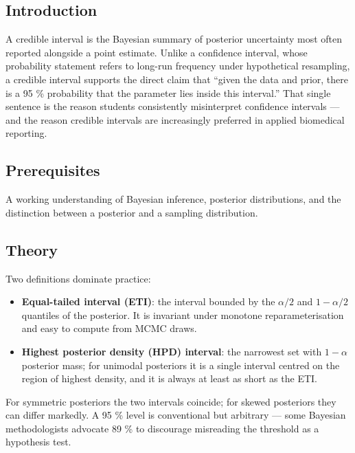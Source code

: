 \documentclass[
]{article}
\author{}
\date{\vspace{-2.5em}}
\providecommand{\tightlist}{%
  \setlength{\itemsep}{0pt}\setlength{\parskip}{0pt}}
\begin{document}
\subsection{Introduction}\label{introduction}

A credible interval is the Bayesian summary of posterior uncertainty
most often reported alongside a point estimate. Unlike a confidence
interval, whose probability statement refers to long-run frequency under
hypothetical resampling, a credible interval supports the direct claim
that ``given the data and prior, there is a 95 \% probability that the
parameter lies inside this interval.'' That single sentence is the
reason students consistently misinterpret confidence intervals --- and
the reason credible intervals are increasingly preferred in applied
biomedical reporting.

\subsection{Prerequisites}\label{prerequisites}

A working understanding of Bayesian inference, posterior distributions,
and the distinction between a posterior and a sampling distribution.

\subsection{Theory}\label{theory}

Two definitions dominate practice:

\begin{itemize}
\tightlist
\item
  \textbf{Equal-tailed interval (ETI)}: the interval bounded by the
  \(\alpha/2\) and \(1 - \alpha/2\) quantiles of the posterior. It is
  invariant under monotone reparameterisation and easy to compute from
  MCMC draws.
\item
  \textbf{Highest posterior density (HPD) interval}: the narrowest set
  with \(1 - \alpha\) posterior mass; for unimodal posteriors it is a
  single interval centred on the region of highest density, and it is
  always at least as short as the ETI.
\end{itemize}

For symmetric posteriors the two intervals coincide; for skewed
posteriors they can differ markedly. A 95 \% level is conventional but
arbitrary --- some Bayesian methodologists advocate 89 \% to discourage
misreading the threshold as a hypothesis test.
\end{document}
